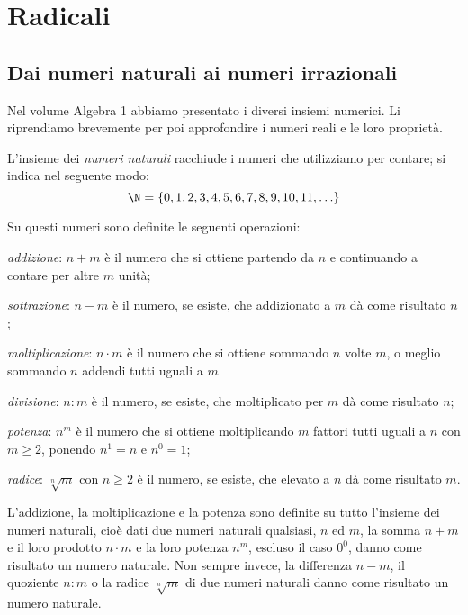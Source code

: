 
\chapter{Radicali}

\section{Dai numeri naturali ai numeri irrazionali}
\label{sec:radicali_irrazionali}
Nel volume Algebra 1 abbiamo presentato i diversi insiemi numerici. Li 
riprendiamo brevemente per poi approfondire i numeri reali e le loro 
proprietà.

L'insieme dei \emph{numeri naturali} racchiude i numeri che utilizziamo per 
contare; si indica nel seguente modo:
\[\N=\{0,1,2,3,4,5,6,7,8,9,10,11,\ldots\}\]

Su questi numeri sono definite le seguenti operazioni:
\begin{itemize*}
 \item \emph{addizione}: \(n+m\) è il numero che si ottiene partendo da \(n\) 
e 
  continuando a contare per altre \(m\) unità;
 \item \emph{sottrazione}: \(n-m\) è il numero, se esiste, che 
  addizionato a \(m\) dà come risultato \(n\);
 \item \emph{moltiplicazione}: \(n \cdot m\) è il numero che si ottiene 
sommando 
  \(n\) volte \(m\), o meglio sommando \(n\) addendi tutti uguali a \(m\)
 \item \emph{divisione}: \(n:m\) è il numero, se esiste, che 
  moltiplicato per \(m\) dà come risultato \(n\);
 \item \emph{potenza}: \(n^{m}\) è il numero che si ottiene moltiplicando 
\(m\) 
  fattori tutti uguali a \(n\) con \(m \ge 2\), ponendo \(n^{1}=n\) e 
\(n^{0}=1\);
 \item \emph{radice}: \(\sqrt[{n}]{m}\) con \(n\ge 2\) è il numero, se 
esiste, 
  che elevato a \(n\) dà come risultato \(m\).
\end{itemize*}

L'addizione, la moltiplicazione e la potenza sono definite su tutto 
l'insieme dei numeri naturali, cioè dati due numeri naturali qualsiasi, \(n\) 
ed \(m\), la somma \(n+m\) e il loro prodotto \(n \cdot m\) e la loro potenza 
\(n^{m}\), escluso il caso \(0^{0}\), danno come risultato un numero 
naturale. 
Non sempre invece, la differenza \(n-m\), il quoziente \(n:m\) o la 
radice \(\sqrt[{n}]{m}\) di due numeri naturali danno come risultato un 
numero naturale.

